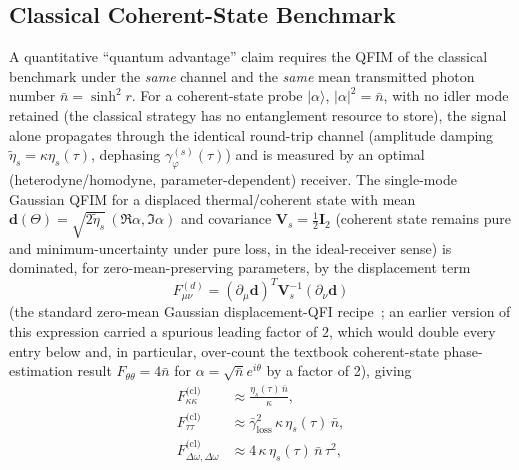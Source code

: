 \documentclass[journal]{IEEEtran}
\begin{document}
\subsection{Classical Coherent-State Benchmark}

A quantitative ``quantum advantage'' claim requires the QFIM of the classical benchmark under the \emph{same} channel and the \emph{same} mean transmitted photon number $\bar n=\sinh^2 r$. For a coherent-state probe $|\alpha\rangle$, $|\alpha|^2=\bar n$, with no idler mode retained (the classical strategy has no entanglement resource to store), the signal alone propagates through the identical round-trip channel (amplitude damping $\tilde\eta_s=\kappa\eta_s(\tau)$, dephasing $\gamma_\varphi^{(s)}(\tau)$) and is measured by an optimal (heterodyne/homodyne, parameter-dependent) receiver. The single-mode Gaussian QFIM for a displaced thermal/coherent state with mean $\boldsymbol d(\Theta)=\sqrt{2\tilde\eta_s}\,(\Re\alpha,\Im\alpha)$ and covariance $\mathbf V_s=\tfrac12\mathbf I_2$ (coherent state remains pure and minimum-uncertainty under pure loss, in the ideal-receiver sense) is dominated, for zero-mean-preserving parameters, by the displacement term
\begin{equation}\label{eq:classical_qfim_recipe}
F_{\mu\nu}^{(d)}=(\partial_\mu\boldsymbol d)^T\mathbf V_s^{-1}(\partial_\nu\boldsymbol d)
\end{equation}
(the standard zero-mean Gaussian displacement-QFI recipe~\cite{safranek2019estimation,braunstein1994statistical}; an earlier version of this expression carried a spurious leading factor of $2$, which would double every entry below and, in particular, over-count the textbook coherent-state phase-estimation result $F_{\theta\theta}=4\bar n$ for $\alpha=\sqrt{\bar n}e^{i\theta}$ by a factor of 2), giving
\begin{align}
F^{\text{(cl)}}_{\kappa\kappa}&\approx\frac{\eta_s(\tau)\,\bar n}{\kappa}, \label{eq:qfim_classical_kappa}\\
F^{\text{(cl)}}_{\tau\tau}&\approx \bar\gamma_{\text{loss}}^2\,\kappa\,\eta_s(\tau)\,\bar n, \label{eq:qfim_classical_tau}\\
F^{\text{(cl)}}_{\Delta\omega,\Delta\omega}&\approx 4\,\kappa\,\eta_s(\tau)\,\bar n\,\tau^2, \label{eq:qfim_classical_doppler}
\end{align}
\end{document}
